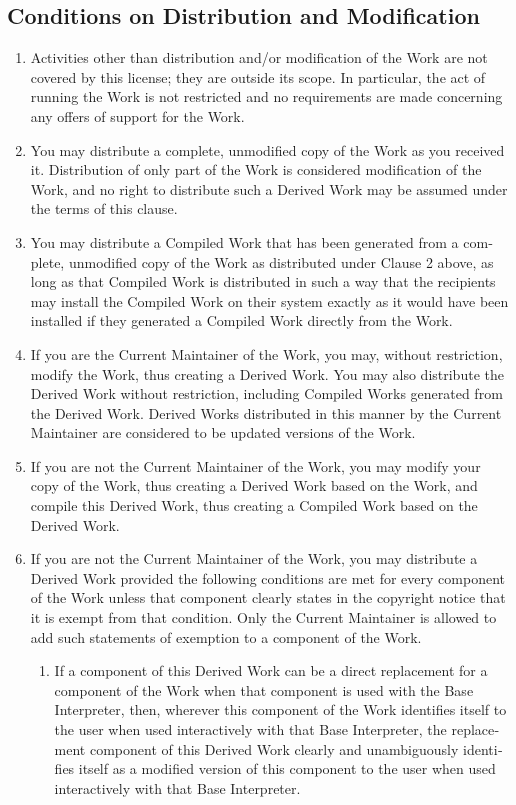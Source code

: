 \begin{otherlanguage}{english}
\section{Conditions on Distribution and Modification}
\begin {enumerate}
\item  Activities other than distribution and/or modification of the
Work are not covered by this license; they are outside its scope.  In
particular, the act of running the Work is not restricted and no
requirements are made concerning any offers of support for the Work.

\item   You may distribute a complete, unmodified copy of the Work as you
received it.  Distribution of only part of the Work is considered
modification of the Work, and no right to distribute such a Derived
Work may be assumed under the terms of this clause.

\item   You may distribute a Compiled Work that has been generated from a
complete, unmodified copy of the Work as distributed under Clause 2
above, as long as that Compiled Work is distributed in such a way that
the recipients may install the Compiled Work on their system exactly as
it would have been installed if they generated a Compiled Work directly
from the Work.

\item   If you are the Current Maintainer of the Work, you may, without
restriction, modify the Work, thus creating a Derived Work.  You may
also distribute the Derived Work without restriction, including
Compiled Works generated from the Derived Work.  Derived Works
distributed in this manner by the Current Maintainer are considered to
be updated versions of the Work.

\item  If you are not the Current Maintainer of the Work, you may modify
your copy of the Work, thus creating a Derived Work based on the Work,
and compile this Derived Work, thus creating a Compiled Work based on
the Derived Work.

\item  If you are not the Current Maintainer of the Work, you may
distribute a Derived Work provided the following conditions are met for
every component of the Work unless that component clearly states in the
copyright notice that it is exempt from that condition.  Only the
Current Maintainer is allowed to add such statements of exemption to a
component of the Work.
\begin {enumerate}
  \item If a component of this Derived Work can be a direct replacement
     for a component of the Work when that component is used with the
     Base Interpreter, then, wherever this component of the Work
     identifies itself to the user when used interactively with that
     Base Interpreter, the replacement component of this Derived Work
     clearly and unambiguously identifies itself as a modified version
     of this component to the user when used interactively with that
     Base Interpreter.


\end{enumerate}
\end{enumerate}
\end{otherlanguage}
